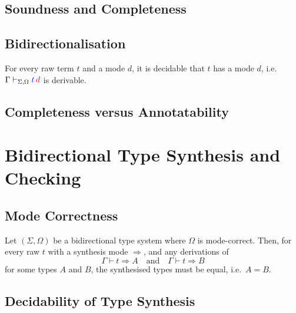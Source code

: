 \documentclass[acmsmall,screen]{acmart}
\theoremstyle{acmdefinition}
\begin{document}
\subsection{Soundness and Completeness}

\subsection{Bidirectionalisation}
\begin{theorem} \label{thm:bidirectionalisation}
  For every raw term $t$ and a mode $d$, it is decidable that $t$ has a mode $d$, i.e.\ $\Gamma \vdash_{\Sigma, \Omega} {\textcolor{blue}{t}}\,{\mathrel{\textcolor{purple}{d}}}$ is derivable.
\end{theorem}

\subsection{Completeness versus Annotatability}


\section{Bidirectional Type Synthesis and Checking} \label{sec:type-synthesis}

\subsection{Mode Correctness}

\begin{theorem}\label{thm:unique-syn}
  Let $(\Sigma, \Omega)$ be a bidirectional type system where $\Omega$ is mode-correct.
  Then, for every raw $t$ with a synthesis mode $\Rightarrow$, and any derivations of 
  \[
    \Gamma \vdash t \Rightarrow A
    \quad\text{and}\quad
    \Gamma \vdash t \Rightarrow B
  \]
  for some types $A$ and $B$, the synthesised types must be equal, i.e.\ $A = B$.
\end{theorem}
 

\subsection{Decidability of Type Synthesis}
\end{document}
